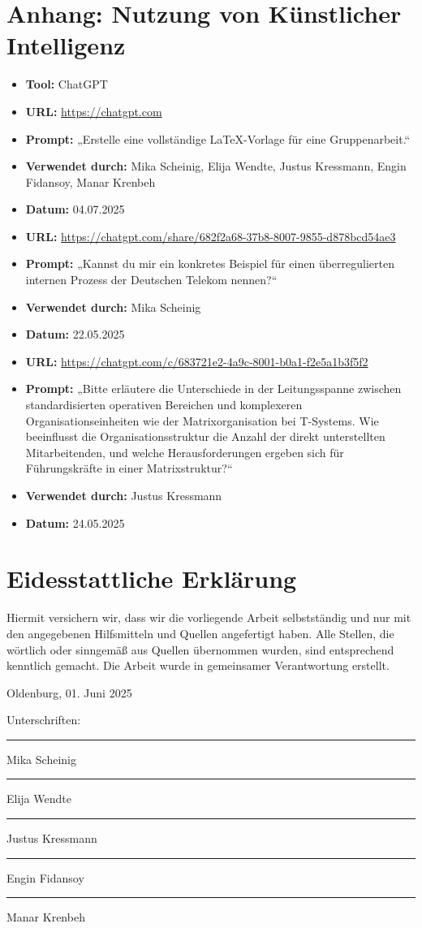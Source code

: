 \documentclass[12pt,a4paper]{article}
\begin{document}
	\section{Anhang: Nutzung von Künstlicher Intelligenz}
	\begin{itemize}
		\item \textbf{Tool:} ChatGPT
		\item \textbf{URL:} \url{https://chatgpt.com}
		\item \textbf{Prompt:} „Erstelle eine vollständige LaTeX-Vorlage für eine Gruppenarbeit.“
		\item \textbf{Verwendet durch:} Mika Scheinig, Elija Wendte, Justus Kressmann, Engin Fidansoy, Manar Krenbeh
		\item \textbf{Datum:} 04.07.2025
	\end{itemize}
	\begin{itemize}
		\item \textbf{URL:} \url{https://chatgpt.com/share/682f2a68-37b8-8007-9855-d878bcd54ae3}
		\item \textbf{Prompt:} „Kannst du mir ein konkretes Beispiel für einen überregulierten internen Prozess der Deutschen Telekom nennen?“
		\item \textbf{Verwendet durch:} Mika Scheinig
		\item \textbf{Datum:} 22.05.2025
	\end{itemize}
	
	\begin{itemize}
		\item \textbf{URL:} \url{https://chatgpt.com/c/683721e2-4a9c-8001-b0a1-f2e5a1b3f5f2}
		\item \textbf{Prompt:} „Bitte erläutere die Unterschiede in der Leitungsspanne zwischen standardisierten operativen Bereichen und komplexeren Organisationseinheiten wie der Matrixorganisation bei T-Systems. Wie beeinflusst die Organisationsstruktur die Anzahl der direkt unterstellten Mitarbeitenden, und welche Herausforderungen ergeben sich für Führungskräfte in einer Matrixstruktur?“
		\item \textbf{Verwendet durch:} Justus Kressmann
		\item \textbf{Datum:} 24.05.2025
	\end{itemize}
	
	\newpage
	\section*{Eidesstattliche Erklärung}
	Hiermit versichern wir, dass wir die vorliegende Arbeit selbstständig und nur mit den angegebenen Hilfsmitteln und Quellen angefertigt haben. Alle Stellen, die wörtlich oder sinngemäß aus Quellen übernommen wurden, sind entsprechend kenntlich gemacht. Die Arbeit wurde in gemeinsamer Verantwortung erstellt.
	
	\vspace{2cm}
	Oldenburg, 01. Juni 2025
	
	Unterschriften: \\
	\rule{5cm}{0.4pt} Mika Scheinig \\
	\rule{5cm}{0.4pt} Elija Wendte \\
	\rule{5cm}{0.4pt} Justus Kressmann \\
	\rule{5cm}{0.4pt} Engin Fidansoy \\
	\rule{5cm}{0.4pt} Manar Krenbeh
	
\end{document}
